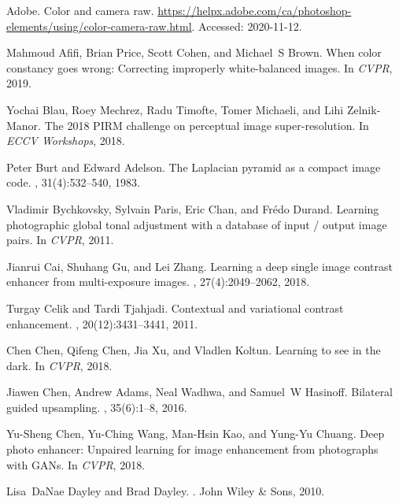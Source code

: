 \documentclass[final]{cvpr}
\begin{document}
{\small
\begin{thebibliography}{10}\itemsep=-1pt

Adobe.
\newblock Color and camera raw.
\newblock
  \url{https://helpx.adobe.com/ca/photoshop-elements/using/color-camera-raw.html}.
\newblock Accessed: 2020-11-12.

Mahmoud Afifi, Brian Price, Scott Cohen, and Michael~S Brown.
\newblock When color constancy goes wrong: Correcting improperly white-balanced
  images.
\newblock In {\em CVPR}, 2019.

Yochai Blau, Roey Mechrez, Radu Timofte, Tomer Michaeli, and Lihi Zelnik-Manor.
\newblock The 2018 {P}{I}{R}{M} challenge on perceptual image super-resolution.
\newblock In {\em ECCV Workshops}, 2018.

Peter Burt and Edward Adelson.
\newblock The {L}aplacian pyramid as a compact image code.
, 31(4):532--540, 1983.

Vladimir Bychkovsky, Sylvain Paris, Eric Chan, and Fr{\'e}do Durand.
\newblock Learning photographic global tonal adjustment with a database of
  input / output image pairs.
\newblock In {\em CVPR}, 2011.

Jianrui Cai, Shuhang Gu, and Lei Zhang.
\newblock Learning a deep single image contrast enhancer from multi-exposure
  images.
, 27(4):2049--2062, 2018.

Turgay Celik and Tardi Tjahjadi.
\newblock Contextual and variational contrast enhancement.
, 20(12):3431--3441, 2011.

Chen Chen, Qifeng Chen, Jia Xu, and Vladlen Koltun.
\newblock Learning to see in the dark.
\newblock In {\em CVPR}, 2018.

Jiawen Chen, Andrew Adams, Neal Wadhwa, and Samuel~W Hasinoff.
\newblock Bilateral guided upsampling.
, 35(6):1--8, 2016.

Yu-Sheng Chen, Yu-Ching Wang, Man-Hsin Kao, and Yung-Yu Chuang.
\newblock Deep photo enhancer: {U}npaired learning for image enhancement from
  photographs with {G}{A}{N}s.
\newblock In {\em CVPR}, 2018.

Lisa~DaNae Dayley and Brad Dayley.
.
\newblock John Wiley \& Sons, 2010.


\end{thebibliography}}
\end{document}

